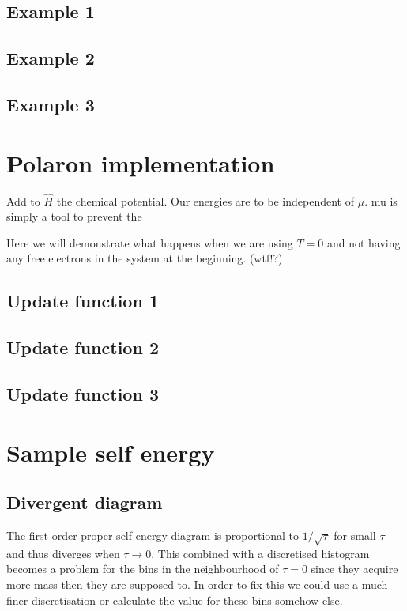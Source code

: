 \documentclass[12pt]{report}
\newcommand{\todo}[1]{{\leavevmode\color{todo}#1}}
\begin{document}
\subsection{Example 1}
\subsection{Example 2}
\subsection{Example 3}

\section{Polaron implementation}


\todo{Add to $ \hat H $ the chemical potential. Our energies are to be independent of $ \mu $. mu is simply a tool to prevent the}

\todo{Here we will demonstrate what happens when we are using $ T = 0 $ and not having any free electrons in the system at the beginning. (wtf!?)}

\subsection{Update function 1}
\subsection{Update function 2}
\subsection{Update function 3}

\section{Sample self energy}

\subsection{Divergent diagram}

The first order proper self energy diagram is proportional to $ 1/\sqrt{\tau} $ for small $ \tau $ and thus diverges when $ \tau \rightarrow 0 $. This combined with a discretised histogram becomes a problem for the bins in the neighbourhood of $ \tau = 0 $ since they acquire more mass then they are supposed to. In order to fix this we could use a much finer discretisation or calculate the value for these bins somehow else.
\end{document}
